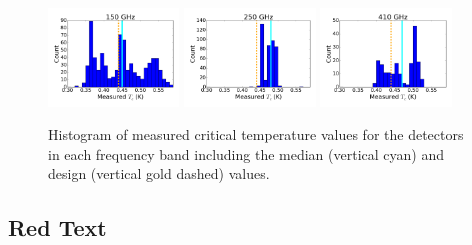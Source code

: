 \begin{figure}[ht!]
\centering
\includegraphics[width=0.31\textwidth]{figures/150_tc_hist.png}
\includegraphics[width=0.31\textwidth]{figures/250_tc_hist.png}
\includegraphics[width=0.31\textwidth]{figures/410_tc_hist.png}
\caption{Histogram of measured critical temperature values for the detectors in each frequency band including the median (vertical cyan) and design (vertical gold dashed) values. 
\label{fig:tc_histograms} }
\end{figure}


\subsection{Red Text}





